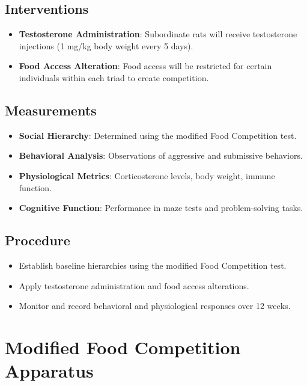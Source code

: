 \documentclass[english, a4paper, 11pt]{article}
\begin{document}
\subsection*{Interventions}
\begin{itemize}
	\item \textbf{Testosterone Administration}: Subordinate rats will receive testosterone injections (1 mg/kg body weight every 5 days).
	\item \textbf{Food Access Alteration}: Food access will be restricted for certain individuals within each triad to create competition.
\end{itemize}

\subsection*{Measurements}
\begin{itemize}
	\item \textbf{Social Hierarchy}: Determined using the modified Food Competition test.
	\item \textbf{Behavioral Analysis}: Observations of aggressive and submissive behaviors.
	\item \textbf{Physiological Metrics}: Corticosterone levels, body weight, immune function.
	\item \textbf{Cognitive Function}: Performance in maze tests and problem-solving tasks.
\end{itemize}

\subsection*{Procedure}
\begin{itemize}
	\item Establish baseline hierarchies using the modified Food Competition test.
	\item Apply testosterone administration and food access alterations.
	\item Monitor and record behavioral and physiological responses over 12 weeks.
\end{itemize}

\section*{Modified Food Competition Apparatus}
\end{document}
